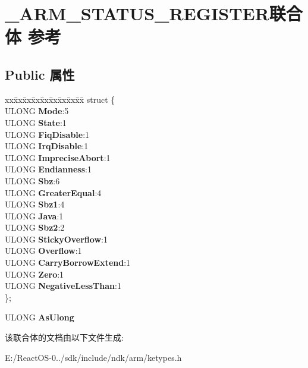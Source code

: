 \hypertarget{union___a_r_m___s_t_a_t_u_s___r_e_g_i_s_t_e_r}{}\section{\+\_\+\+A\+R\+M\+\_\+\+S\+T\+A\+T\+U\+S\+\_\+\+R\+E\+G\+I\+S\+T\+E\+R联合体 参考}
\label{union___a_r_m___s_t_a_t_u_s___r_e_g_i_s_t_e_r}
\subsection*{Public 属性}
\begin{DoxyCompactItemize}
\item 
\mbox{\label{union___a_r_m___s_t_a_t_u_s___r_e_g_i_s_t_e_r_a908155f02d29fa57e5c1fdacc896e009}} 
\begin{tabbing}
xx\=xx\=xx\=xx\=xx\=xx\=xx\=xx\=xx\=\kill
struct \{\\
\>ULONG {\bfseries Mode}:5\\
\>ULONG {\bfseries State}:1\\
\>ULONG {\bfseries FiqDisable}:1\\
\>ULONG {\bfseries IrqDisable}:1\\
\>ULONG {\bfseries ImpreciseAbort}:1\\
\>ULONG {\bfseries Endianness}:1\\
\>ULONG {\bfseries Sbz}:6\\
\>ULONG {\bfseries GreaterEqual}:4\\
\>ULONG {\bfseries Sbz1}:4\\
\>ULONG {\bfseries Java}:1\\
\>ULONG {\bfseries Sbz2}:2\\
\>ULONG {\bfseries StickyOverflow}:1\\
\>ULONG {\bfseries Overflow}:1\\
\>ULONG {\bfseries CarryBorrowExtend}:1\\
\>ULONG {\bfseries Zero}:1\\
\>ULONG {\bfseries NegativeLessThan}:1\\
\}; \\

\end{tabbing}\item 
\mbox{\label{union___a_r_m___s_t_a_t_u_s___r_e_g_i_s_t_e_r_ab016c86488cf9fca306450789f631d4d}} 
U\+L\+O\+NG {\bfseries As\+Ulong}
\end{DoxyCompactItemize}


该联合体的文档由以下文件生成\+:\begin{DoxyCompactItemize}
\item 
E\+:/\+React\+O\+S-\/0../sdk/include/ndk/arm/ketypes.\+h\end{DoxyCompactItemize}
